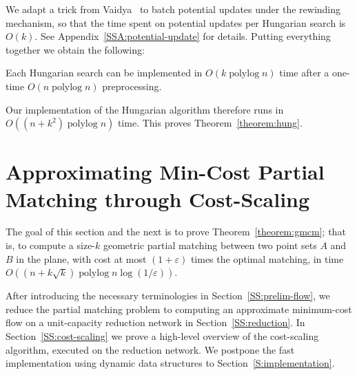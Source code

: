 \documentclass[a4paper,UKenglish]{socg-lipics-v2018}
\makeatletter
\def\note#1{\textcolor{red}{{#1}}}
\def\polylog{\mathop{\mathrm{polylog}}}
\def\eps{\varepsilon}
\theoremstyle{plain}
\numberwithin{figure}{section}
\def\n@te#1{\textsf{\boldmath \textbf{$\langle\!\langle$#1$\rangle\!\rangle$}}\leavevmode}
\def\note#1{\textcolor{red}{\n@te{#1}}}
\makeatother
\begin{document}
We adapt a trick from Vaidya~\cite{Vaidya89} to batch potential updates under the rewinding mechanism,
so that the time spent on potential updates per Hungarian search is $O(k)$.  See Appendix~\ref{SSA:potential-update} for details.
%
Putting everything together we obtain the following:
\begin{lemma}
\label{L:fast-hungarian}
Each Hungarian search can be implemented
in $O(k\polylog n)$ time after a one-time $O(n\polylog n)$ preprocessing.
\end{lemma}

Our implementation of the Hungarian algorithm therefore runs in
$O((n + k^2)\polylog n)$ time.  This proves Theorem~\ref{theorem:hung}.


\section{Approximating Min-Cost Partial Matching through Cost-Scaling}
\label{section:goldberg}

The goal of this section and the next is to prove Theorem~\ref{theorem:gmcm}; that is, to compute a size-$k$ geometric partial matching between two point sets $A$ and $B$ in the plane, with cost at most $(1+\eps)$ times the optimal matching, in time $O((n + k\sqrt{k})\polylog n \log(1/\eps))$.
%
%

After introducing the necessary terminologies in Section~\ref{SS:prelim-flow}, we reduce the partial matching problem to computing an approximate minimum-cost flow on a unit-capacity reduction network in Section~\ref{SS:reduction}.
In Section~\ref{SS:cost-scaling} we prove a high-level overview of the cost-scaling algorithm, executed on the reduction network.
We postpone the fast implementation using dynamic data structures to Section~\ref{S:implementation}.
\end{document}
